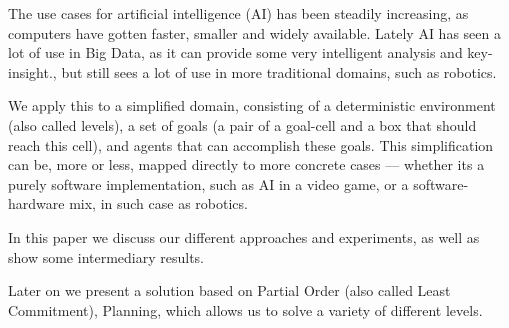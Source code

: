 \documentclass[Main]{subfiles}
\begin{document}

The use cases for artificial intelligence (AI) has been steadily increasing, as computers have gotten faster, smaller and widely available.
Lately AI has seen a lot of use in Big Data, as it can provide some very intelligent analysis and key-insight.\cite{OLeary2013},
but still sees a lot of use in more traditional domains, such as robotics.

We apply this to a simplified domain, consisting of a deterministic environment (also called levels), a set of goals (a pair of a goal-cell and a box that should reach this cell), and agents that can accomplish these goals.
This simplification can be, more or less, mapped directly to more concrete cases --- 
whether its a purely software implementation, such as AI in a video game, or a software-hardware mix, in such case as robotics.

In this paper we discuss our different approaches and experiments, as well as show some intermediary results.

Later on we present a solution based on Partial Order (also called Least Commitment), Planning, 
which allows us to solve a variety of different levels. 

\end{document}
